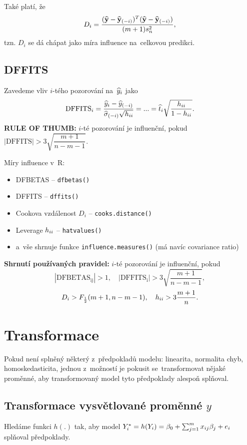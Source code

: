 \begin{remark}
	Také platí, že
	 $$ D_i = \frac{(\widehat{\mathbf{y}}-\widehat{\mathbf{y}}_{(-i)})^T(\widehat{\mathbf{y}}-\widehat{\mathbf{y}}_{(-i)})}{(m+1)s_n^2},$$
	tzn. $D_i$ se dá chápat jako míra influence na~celkovou predikci.
\end{remark}

\subsection{DFFITS}
Zavedeme vliv $i$-tého pozorování na~$\widehat{y}_i$ jako
 $$ \mathrm{DFFITS}_i = \frac{\widehat{y}_i-\widehat{y}_{(-i)}}{\widehat{{\sigma}}_{(-i)}\sqrt{h_{ii}}} = ... = \widehat{t}_i\sqrt{\frac{h_{ii}}{1-h_{ii}}}. $$
\textbf{RULE OF THUMB:} $i$-té pozorování je influenční, pokud $|\mathrm{DFFITS}|>3\sqrt{\dfrac{m+1}{n-m-1}}$.

\begin{remark}Míry influence v~R:
\begin{itemize}
	\item DFBETAS -- \verb|dfbetas()|
	\item DFFITS -- \verb|dffits()|
	\item Cookova vzdálenost $D_i$ -- \verb|cooks.distance()|
	\item Leverage $h_{ii}$ -- \verb|hatvalues()|
	\item a~vše shrnuje funkce \verb|influence.measures()| (má navíc covariance ratio)
\end{itemize}
\end{remark}

\textbf{Shrnutí používaných pravidel:} $i$-té pozorování je influenční, pokud
$$|\mathrm{DFBETAS_{ij}} | > 1, \quad |\mathrm{DFFITS_i}| > 3 \sqrt{\frac{m+1}{n-m-1}},$$
$$ D_i > F_{\frac{1}{2}}(m+1,n-m-1), \quad h_{ii} > 3 \frac{m+1}{n}.$$


\section{Transformace}

Pokud není splněný některý z~předpokladů modelu: linearita, normalita chyb, homoskedasticita, jednou z~možností je pokusit se~transformovat nějaké proměnné, aby transformovaný model tyto předpoklady alespoň  splňoval.

\subsection{Transformace vysvětlované proměnné $y$ }

Hledáme funkci $h(.)$ tak, aby model $Y_i^* = h(Y_i) = \beta_0 + \sum_{j=1}^{m} x_{ij} \beta_j + e_i$ splňoval předpoklady.

